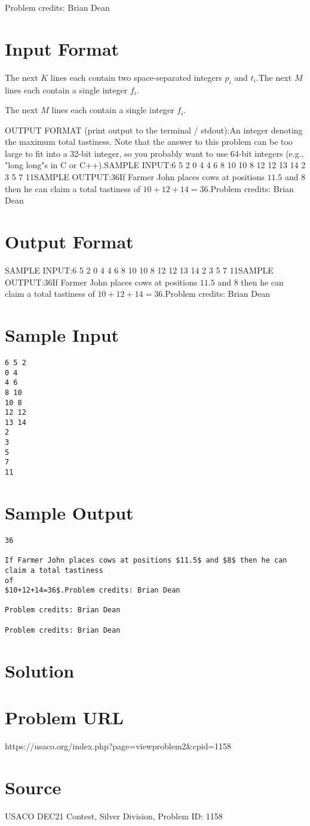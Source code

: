 \documentclass[12pt]{article}
\begin{document}
Problem credits: Brian Dean



\section*{Input Format}
The next $K$ lines each contain two space-separated integers $p_i$ and $t_i$.The next $M$ lines each contain a single integer $f_i$.

The next $M$ lines each contain a single integer $f_i$.

OUTPUT FORMAT (print output to the terminal / stdout):An integer denoting the maximum total tastiness. Note that the answer to this
problem can be too large to fit into a 32-bit integer, so you probably want to
use 64-bit integers (e.g., "long long"s in C or C++).SAMPLE INPUT:6 5 2
0 4
4 6
8 10
10 8
12 12
13 14
2
3
5
7
11SAMPLE OUTPUT:36If Farmer John places cows at positions $11.5$ and $8$ then he can claim a total tastiness
of
$10+12+14=36$.Problem credits: Brian Dean

\section*{Output Format}
SAMPLE INPUT:6 5 2
0 4
4 6
8 10
10 8
12 12
13 14
2
3
5
7
11SAMPLE OUTPUT:36If Farmer John places cows at positions $11.5$ and $8$ then he can claim a total tastiness
of
$10+12+14=36$.Problem credits: Brian Dean

\section*{Sample Input}
\begin{verbatim}
6 5 2
0 4
4 6
8 10
10 8
12 12
13 14
2
3
5
7
11
\end{verbatim}

\section*{Sample Output}
\begin{verbatim}
36

If Farmer John places cows at positions $11.5$ and $8$ then he can claim a total tastiness
of
$10+12+14=36$.Problem credits: Brian Dean

Problem credits: Brian Dean

Problem credits: Brian Dean
\end{verbatim}

\section*{Solution}


\section*{Problem URL}
https://usaco.org/index.php?page=viewproblem2&cpid=1158

\section*{Source}
USACO DEC21 Contest, Silver Division, Problem ID: 1158
\end{document}

